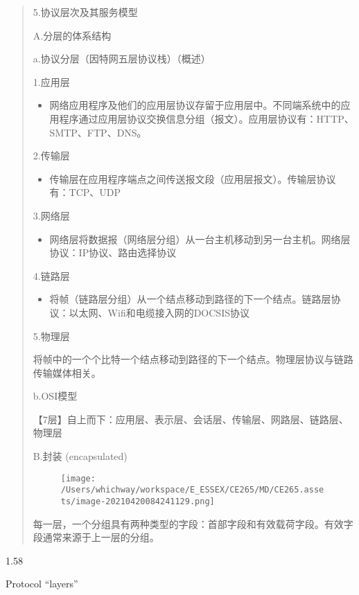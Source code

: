\documentclass[
]{article}
\begin{document}
\begin{quote}
5.协议层次及其服务模型

A.分层的体系结构

a.协议分层（因特网五层协议栈）（概述）

1.应用层

\begin{itemize}
\item
  网络应用程序及他们的应用层协议存留于应用层中。不同端系统中的应用程序通过应用层协议交换信息分组（报文）。应用层协议有：HTTP、SMTP、FTP、DNS。
\end{itemize}

2.传输层

\begin{itemize}
\item
  传输层在应用程序端点之间传送报文段（应用层报文）。传输层协议有：TCP、UDP
\end{itemize}

3.网络层

\begin{itemize}
\item
  网络层将数据报（网络层分组）从一台主机移动到另一台主机。网络层协议：IP协议、路由选择协议
\end{itemize}

4.链路层

\begin{itemize}
\item
  将帧（链路层分组）从一个结点移动到路径的下一个结点。链路层协议：以太网、Wifi和电缆接入网的DOCSIS协议
\end{itemize}

5.物理层

将帧中的一个个比特一个结点移动到路径的下一个结点。物理层协议与链路传输媒体相关。

b.OSI模型

【7层】自上而下：应用层、表示层、会话层、传输层、网路层、链路层、物理层

B.封装 (encapsulated)

\begin{figure}
\centering
\texttt{[image: /Users/whichway/workspace/E\_ESSEX/CE265/MD/CE265.assets/image-20210420084241129.png]}
\caption{}
\end{figure}

每一层，一个分组具有两种类型的字段：首部字段和有效载荷字段。有效字段通常来源于上一层的分组。
\end{quote}

1.58

Protocol ``layers''
\end{document}

